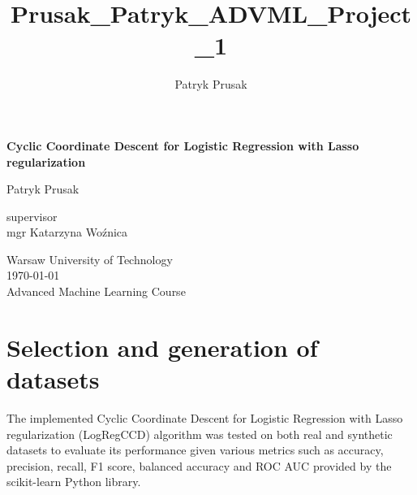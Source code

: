 \documentclass[11pt]{article}
\begin{document}
\thispagestyle{empty}

\title{Prusak_Patryk_ADVML_Project_1}
\author{\normalsize Patryk Prusak }
\hspace{0pt}
\vfill
\begin{center}

    \textbf{\huge{Cyclic Coordinate Descent for Logistic Regression with Lasso regularization}}
    
\end{center}

\vspace{0.5cm}
\begin{center}
    \normalsize{Patryk Prusak}
\end{center}
\vspace{0.5cm}
\begin{center}
    \normalsize{supervisor}\\
    \vspace{0.3cm}
    \normalsize{mgr Katarzyna Woźnica}
\end{center}

\vspace{0.5cm}

\begin{center} 
\normalsize{Warsaw University of Technology} \\
\vspace{0.3cm}
\normalsize{\today} \\
\vspace{0.3cm}
Advanced Machine Learning Course
\end{center}

\vspace{1cm}


\tableofcontents
\vfill
\hspace{0pt}
\newpage
{}
\section{Selection and generation of datasets}

The implemented Cyclic Coordinate Descent for Logistic Regression with Lasso regularization (LogRegCCD) algorithm was tested on both real and synthetic datasets to evaluate its performance given various metrics such as accuracy, precision, recall, F1 score, balanced accuracy and ROC AUC \cite{powers2011evaluation, brodersen2010balanced, fawcett2006introduction} provided by the scikit-learn \cite{scikit-learn} Python \cite{python} library. \par 
\end{document}
